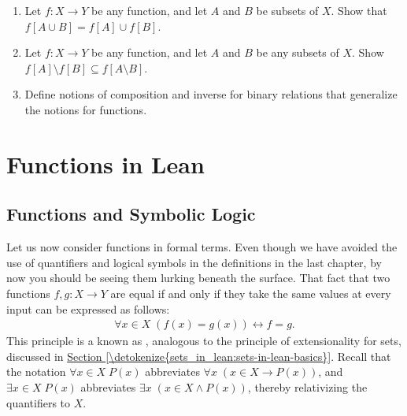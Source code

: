 \documentclass[letterpaper,10pt,english]{sphinxmanual}
\begin{document}
\begin{enumerate}
\item {} 
\sphinxAtStartPar
Let \(f : X \to Y\) be any function, and let \(A\) and \(B\) be subsets of \(X\). Show that \(f [A \cup B] = f[A] \cup f[B]\).

\item {} 
\sphinxAtStartPar
Let \(f: X \to Y\) be any function, and let \(A\) and \(B\) be any subsets of \(X\). Show \(f[A] \setminus f[B] \subseteq f[A \setminus B]\).

\item {} 
\sphinxAtStartPar
Define notions of composition and inverse for binary relations that generalize the notions for functions.

\end{enumerate}


\chapter{Functions in Lean}
\label{\detokenize{functions_in_lean:functions-in-lean}}\label{\detokenize{functions_in_lean::doc}}

\section{Functions and Symbolic Logic}
\label{\detokenize{functions_in_lean:functions-and-symbolic-logic}}
\sphinxAtStartPar
Let us now consider functions in formal terms. Even though we have avoided the use of quantifiers and logical symbols in the definitions in the last chapter, by now you should be seeing them lurking beneath the surface. That fact that two functions \(f, g : X \to Y\) are equal if and only if they take the same values at every input can be expressed as follows:
\begin{equation*}
\begin{split}\forall x \in X \; (f(x) = g(x)) \leftrightarrow f = g .\end{split}
\end{equation*}
\sphinxAtStartPar
This principle is a known as , analogous to the principle of extensionality for sets, discussed in \hyperref[\detokenize{sets_in_lean:sets-in-lean-basics}]{Section \ref{\detokenize{sets_in_lean:sets-in-lean-basics}}}. Recall that the notation \(\forall x \in X \; P(x)\) abbreviates \(\forall x \; (x \in X \to P(x))\), and \(\exists x \in X \; P(x)\) abbreviates \(\exists x \; (x \in X \wedge P(x))\), thereby relativizing the quantifiers to \(X\).
\end{document}
